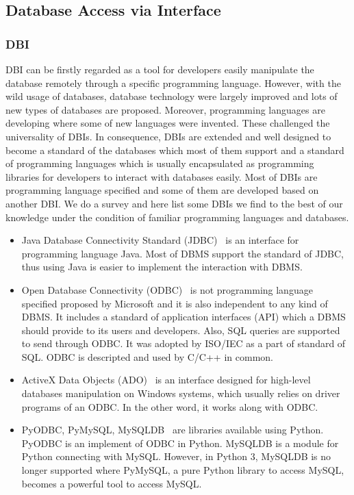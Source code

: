 \documentclass[onecolumn, conference, 12pt]{IEEEtran}
\begin{document}
	
	
	\subsection{Database Access via Interface}
	\subsubsection{DBI}
	DBI can be firstly regarded as a tool for developers easily manipulate the database remotely through a specific programming language. However, with the wild usage of databases, database technology were largely improved and lots of new types of databases are proposed. Moreover, programming languages are developing where some of new languages were invented. These challenged the universality of DBIs. In consequence, DBIs are extended and well designed to become a standard of the databases which most of them support and a standard of programming languages which is usually encapsulated as programming libraries for developers to interact with databases easily. Most of DBIs are programming language specified and some of them are developed based on another DBI. We do a survey and here list some DBIs we find to the best of our knowledge under the condition of familiar programming languages and databases. 
	\begin{itemize}[]
		\item Java Database Connectivity Standard (JDBC)~\cite{JDBC} is an interface for programming language Java. Most of DBMS support the standard of JDBC, thus using Java is easier to implement the interaction with DBMS.
		\item Open Database Connectivity (ODBC)~\cite{ODBC} is not programming language specified proposed by Microsoft and it is also independent to any kind of DBMS. It includes a standard of application interfaces (API) which a DBMS should provide to its users and developers. Also, SQL queries are supported to send through ODBC. It was adopted by ISO/IEC as a part of standard of SQL. ODBC is descripted and used by C/C++ in common.
		\item ActiveX Data Objects (ADO)~\cite{ADO} is an interface designed for high-level databases manipulation on Windows systems, which usually relies on driver programs of an ODBC. In the other word, it works along with ODBC.
		\item PyODBC, PyMySQL, MySQLDB~\cite{pyodbc,pymysql,mysqldb} are libraries available using Python. PyODBC is an implement of ODBC in Python. MySQLDB is a module for Python connecting with MySQL. However, in Python 3, MySQLDB is no longer supported where PyMySQL, a pure Python library to access MySQL, becomes a powerful tool to access MySQL.
	\end{itemize}
\end{document}
